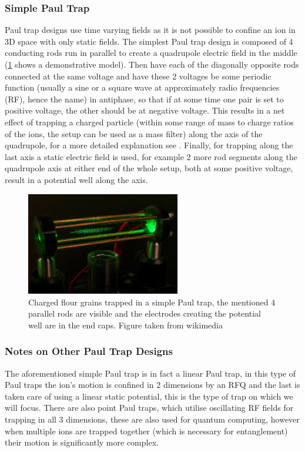 \subsubsection{Simple Paul Trap}
Paul trap designs use time varying fields as it is not possible to confine an ion in 3D space with only static fields.
The simplest Paul trap design is composed of 4 conducting rods run in parallel to create a quadrupole electric field in the middle (\cref{fig:TIQC_RFQ_Flour} shows a demonstrative model).
Then have each of the diagonally opposite rods connected at the same voltage and have these 2 voltages be some periodic function (usually a sine or a square wave at approximately radio frequencies (RF), hence the name) in antiphase, so that if at some time one pair is set to positive voltage, the other should be at negative voltage.
This results in a net effect of trapping a charged particle (within some range of mass to charge ratios of the ions, the setup can be used as a mass filter) along the axis of the quadrupole, for a more detailed explanation see \cite{paulElectromagneticTrapsCharged1990}.
Finally, for trapping along the last axis a static electric field is used, for example 2 more rod segments along the quadrupole axis at either end of the whole setup, both at some positive voltage, result in a potential well along the axis.

\begin{figure}[H]
    \centering
    \includegraphics[width=0.6\textwidth]{images/TIQC_RFQ_Flour.jpg}
    \caption{Charged flour grains trapped in a simple Paul trap, the mentioned 4 parallel rods are visible and the electrodes creating the potential well are in the end caps.
    Figure taken from wikimedia \cite{pavelkaPaulTrap}}\label{fig:TIQC_RFQ_Flour}
\end{figure}

\subsubsection{Notes on Other Paul Trap Designs} \label{sec:other_paultraps}
The aforementioned simple Paul trap is in fact a linear Paul trap, in this type of Paul traps the ion's motion is confined in 2 dimensions by an RFQ and the last is taken care of using a linear static potential, this is the type of trap on which we will focus.
There are also point Paul traps, which utilise oscillating RF fields for trapping in all 3 dimensions, these are also used for quantum computing, however when multiple ions are trapped together (which is necessary for entanglement) their motion is significantly more complex.

